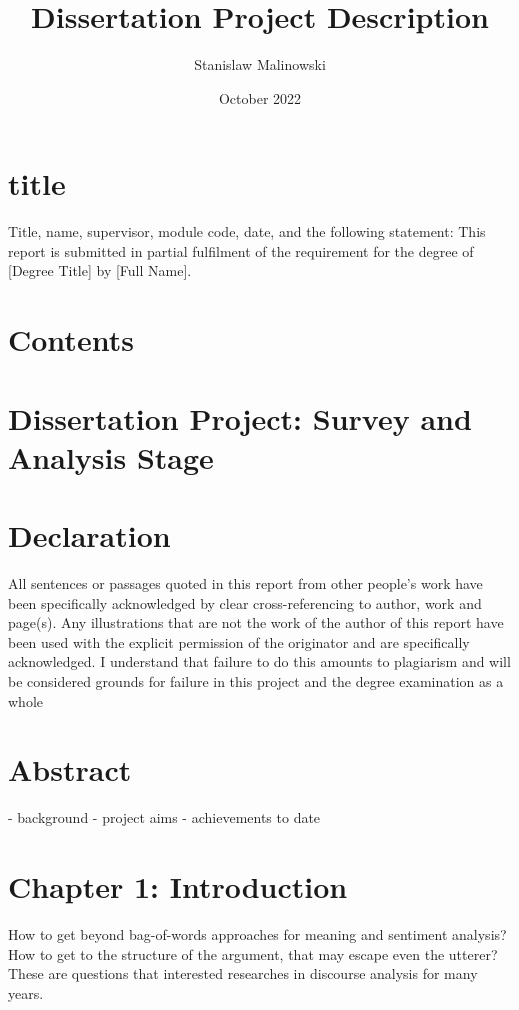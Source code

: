 \documentclass{article}
\title{Dissertation Project Description}
\author{Stanislaw Malinowski}
\date{October 2022}
\begin{document}
\maketitle
\section{title}
Title, name, supervisor, module code, date,
and the following statement: This report is submitted in partial fulfilment of the requirement for the degree of [Degree Title] by [Full Name].

\section*{Contents}
\tableofcontents
\newpage
\section{Dissertation Project: Survey and Analysis Stage}

\section{Declaration}
All sentences or passages quoted in this report from other people's work have been specifically acknowledged by clear cross-referencing to author, work and page(s). Any illustrations that are not the work of the author of this report have been used with the explicit permission of the originator and are specifically acknowledged. I understand that failure to do this amounts to plagiarism and will be considered grounds for failure in this project and the degree examination as a whole
\newpage

\section{Abstract}
- background
- project aims
- achievements to date

\section{Chapter 1: Introduction}
How to get beyond bag-of-words approaches for meaning and sentiment analysis? 
How to get to the structure of the argument, that may escape even the utterer?
These are questions that interested researches in discourse analysis for many years.
\end{document}
